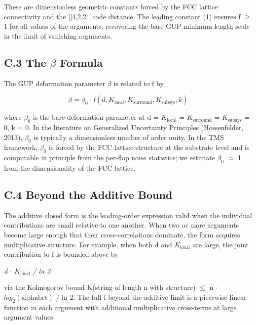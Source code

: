 \documentclass[11pt,oneside]{report}
\theoremstyle{definition}
\theoremstyle{remark}
\begin{document}
These are dimensionless geometric constants forced by the FCC lattice
connectivity and the [[4,2,2]] code distance. The leading
constant (1) ensures f \ensuremath{\geq} 1 for all values of the arguments, recovering
the bare GUP minimum length scale in the limit of vanishing arguments.

\subsection*{C.3 The \ensuremath{\beta} Formula}

The GUP deformation parameter \ensuremath{\beta} is related to f by

\begin{equation*}
\beta = \beta_{0} \cdot f(d, K_{\mathrm{local}}, K_{\mathrm{surround}}, K_{\mathrm{subsys}}, k)
\end{equation*}

where \ensuremath{\beta_{0}} is the bare deformation parameter at d = \ensuremath{K_{\mathrm{local}}} =
\ensuremath{K_{\mathrm{surround}}} = \ensuremath{K_{\mathrm{subsys}}} = 0, k = 0. In the literature on Generalized
Uncertainty Principles (Hossenfelder, 2013), \ensuremath{\beta_{0}} is typically a
dimensionless number of order unity. In the TMS framework, \ensuremath{\beta_{0}} is
forced by the FCC lattice structure at the substrate level and is
computable in principle from the per-flop noise statistics; we estimate
\ensuremath{\beta_{0}} \ensuremath{\approx} 1 from the dimensionality of the FCC lattice.

\subsection*{C.4 Beyond the Additive Bound}

The additive closed form is the leading-order expression valid when the
individual contributions are small relative to one another. When two or
more arguments become large enough that their cross-correlations
dominate, the form acquires multiplicative structure. For example, when
both d and \ensuremath{K_{\mathrm{local}}} are large, the joint contribution to f is bounded
above by

\emph{d \ensuremath{\cdot} \ensuremath{K_{\mathrm{local}}} / ln 2}

via the Kolmogorov bound K(string of length n with structure) \ensuremath{\leq} n \ensuremath{\cdot}
\ensuremath{log_{2}(\text{alphabet})} / ln 2. The full f beyond the additive limit is a
piecewise-linear function in each argument with additional
multiplicative cross-terms at large argument values.
\end{document}
